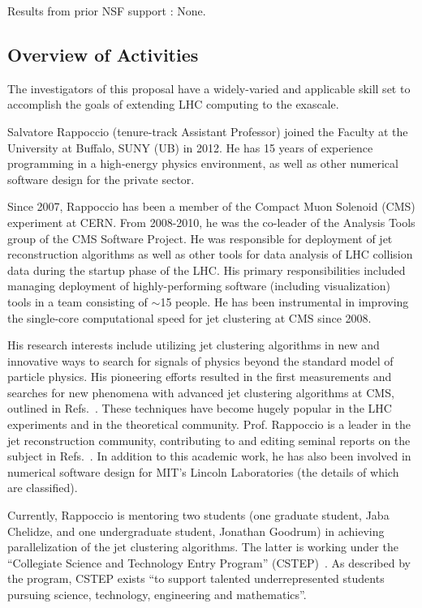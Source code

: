 \documentclass[times,11pt]{article}
\begin{document}
Results from prior NSF support : None. 

\subsection{Overview of Activities}

The investigators of this proposal have a
widely-varied and applicable skill set to accomplish the goals of
extending LHC computing to the exascale. 




Salvatore Rappoccio (tenure-track Assistant Professor) joined the
Faculty at the University at Buffalo, SUNY (UB) in 2012. He has 15
years of experience programming in a
high-energy physics environment, as well as other numerical software
design for the private sector.

Since 2007, Rappoccio has been a member of the Compact Muon Solenoid
(CMS) experiment at CERN. 
From 2008-2010, he was the co-leader of the Analysis Tools group of
the CMS Software Project. He was responsible for deployment of jet
reconstruction algorithms as well as other tools for data analysis of
LHC collision data during the startup phase of the LHC. His primary
responsibilities included managing deployment of highly-performing
software (including visualization) tools in a team consisting of
$\sim$15 people. He has been instrumental in improving the single-core
computational speed for jet clustering at CMS since 2008. 

His research interests include utilizing jet clustering algorithms in
new and innovative ways to search for signals of physics beyond the
standard model of particle physics. His pioneering efforts resulted in
the first measurements and searches for new phenomena with advanced jet clustering
algorithms at CMS, outlined in 
Refs.~\cite{EXO-11-006,EXO-11-095,SMP-12-019}. These
techniques have become hugely popular in the LHC experiments and in
the theoretical community. Prof. Rappoccio is a leader in the jet
reconstruction community, contributing to and editing seminal reports
on the subject in Refs.~\cite{boost2010,boost2011,boost2012}.
In addition to this academic work, he has also been involved in
numerical software design for MIT's Lincoln Laboratories (the details
of which are classified). 

Currently, Rappoccio is mentoring two students (one graduate student,
Jaba Chelidze, and one undergraduate student, Jonathan Goodrum) in
achieving parallelization of the jet clustering algorithms. The latter
is working under the ``Collegiate Science and Technology Entry
Program'' (CSTEP)~\cite{cstep}. As described by the program, CSTEP
exists ``to support talented underrepresented students pursuing
science, technology, engineering and mathematics''. 
\end{document}

